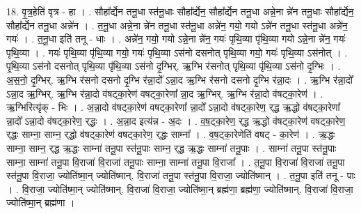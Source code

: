 \documentclass[17pt]{extarticle}
\begin{document}
18. वृ॒त्र॒हेति॑ वृत्र - हा । . सौहा᳚र्द्येन तनू॒धा स्त॑नू॒धाः सौहा᳚र्द्येन॒ सौहा᳚र्द्येन तनू॒धा अन्ने॒ना न्ने॑न तनू॒धाः सौहा᳚र्द्येन॒ सौहा᳚र्द्येन तनू॒धा अन्ने॑न । . त॒नू॒धा अन्ने॒ना न्ने॑न तनू॒धा स्त॑नू॒धा अन्ने॑न॒ गयो॒ गयो ऽन्ने॑न तनू॒धा स्त॑नू॒धा अन्ने॑न॒ गयः॑ । . त॒नू॒धा इति॑ तनू - धाः । . अन्ने॑न॒ गयो॒ गयो ऽन्ने॒ना न्ने॑न॒ गयः॑ पृथि॒व्या पृ॑थि॒व्या गयो ऽन्ने॒ना न्ने॑न॒ गयः॑ पृथि॒व्या । . गयः॑ पृथि॒व्या पृ॑थि॒व्या गयो॒ गयः॑ पृथि॒व्या ऽस॑नो दसनोत् पृथि॒व्या गयो॒ गयः॑ पृथि॒व्या ऽस॑नोत् । . पृ॒थि॒व्या ऽस॑नो दसनोत् पृथि॒व्या पृ॑थि॒व्या ऽस॑नो दृ॒ग्भिर्. ऋ॒ग्भि र॑सनोत् पृथि॒व्या पृ॑थि॒व्या ऽस॑नो दृ॒ग्भिः । . अ॒स॒नो॒ दृ॒ग्भिर्. ऋ॒ग्भि र॑सनो दसनो दृ॒ग्भि र॑न्ना॒दो᳚ ऽन्ना॒द ऋ॒ग्भि र॑सनो दसनो दृ॒ग्भि र॑न्ना॒दः । . ऋ॒ग्भि र॑न्ना॒दो᳚ ऽन्ना॒द ऋ॒ग्भिर्. ऋ॒ग्भि र॑न्ना॒दो व॑षट्का॒रेण॑ वषट्का॒रेणा᳚ न्ना॒द ऋ॒ग्भिर्. ऋ॒ग्भि र॑न्ना॒दो व॑षट्का॒रेण॑ । . ऋ॒ग्भिरित्यृ॑क् - भिः । . अ॒न्ना॒दो व॑षट्का॒रेण॑ वषट्का॒रेणा᳚ न्ना॒दो᳚ ऽन्ना॒दो व॑षट्का॒रेण॒ र्‌द्ध ऋ॒द्धो व॑षट्का॒रेणा᳚ न्ना॒दो᳚ ऽन्ना॒दो व॑षट्का॒रेण॒ र्‌द्धः । . अ॒न्ना॒द इत्य॑न्न - अ॒दः । . व॒ष॒ट्का॒रेण॒ र्‌द्ध ऋ॒द्धो व॑षट्का॒रेण॑ वषट्का॒रेण॒ र्‌द्धः साम्ना॒ साम्न॒ र्‌द्धो व॑षट्का॒रेण॑ वषट्का॒रेण॒ र्‌द्धः साम्ना᳚ । . व॒ष॒ट्का॒रेणेति॑ वषट् - का॒रेण॑ । . ऋ॒द्धः साम्ना॒ साम्न॒ र्‌द्ध ऋ॒द्धः साम्ना॑ तनू॒पा स्त॑नू॒पाः साम्न॒ र्‌द्ध ऋ॒द्धः साम्ना॑ तनू॒पाः । . साम्ना॑ तनू॒पा स्त॑नू॒पाः साम्ना॒ साम्ना॑ तनू॒पा वि॒राजा॑ वि॒राजा॑ तनू॒पाः साम्ना॒ साम्ना॑ तनू॒पा वि॒राजा᳚ । . त॒नू॒पा वि॒राजा॑ वि॒राजा॑ तनू॒पा स्त॑नू॒पा वि॒राजा॒ ज्योति॑ष्मा॒न् ज्योति॑ष्मान्. वि॒राजा॑ तनू॒पा स्त॑नू॒पा वि॒राजा॒ ज्योति॑ष्मान् । . त॒नू॒पा इति॑ तनू - पाः । . वि॒राजा॒ ज्योति॑ष्मा॒न् ज्योति॑ष्मान्. वि॒राजा॑ वि॒राजा॒ ज्योति॑ष्मा॒न् ब्रह्म॑णा॒ ब्रह्म॑णा॒ ज्योति॑ष्मान्. वि॒राजा॑ वि॒राजा॒ ज्योति॑ष्मा॒न् ब्रह्म॑णा । \newline
\end{document}
